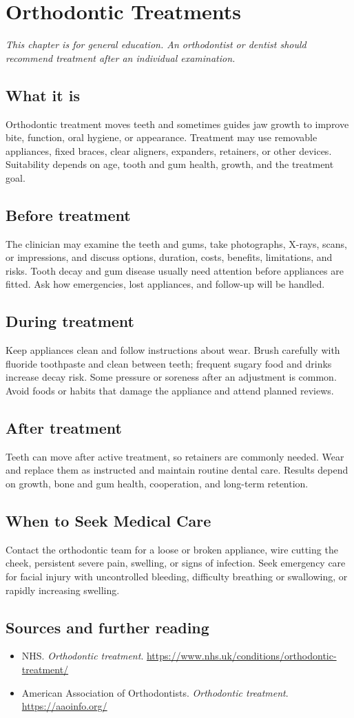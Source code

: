 \chapter{Orthodontic Treatments}

\medskip
\noindent\textit{This chapter is for general education. An orthodontist or dentist should recommend treatment after an individual examination.}

\section*{What it is}
Orthodontic treatment moves teeth and sometimes guides jaw growth to improve bite, function, oral hygiene, or appearance. Treatment may use removable appliances, fixed braces, clear aligners, expanders, retainers, or other devices. Suitability depends on age, tooth and gum health, growth, and the treatment goal.

\section*{Before treatment}
The clinician may examine the teeth and gums, take photographs, X-rays, scans, or impressions, and discuss options, duration, costs, benefits, limitations, and risks. Tooth decay and gum disease usually need attention before appliances are fitted. Ask how emergencies, lost appliances, and follow-up will be handled.

\section*{During treatment}
Keep appliances clean and follow instructions about wear. Brush carefully with fluoride toothpaste and clean between teeth; frequent sugary food and drinks increase decay risk. Some pressure or soreness after an adjustment is common. Avoid foods or habits that damage the appliance and attend planned reviews.

\section*{After treatment}
Teeth can move after active treatment, so retainers are commonly needed. Wear and replace them as instructed and maintain routine dental care. Results depend on growth, bone and gum health, cooperation, and long-term retention.

\section*{When to Seek Medical Care}
Contact the orthodontic team for a loose or broken appliance, wire cutting the cheek, persistent severe pain, swelling, or signs of infection. Seek emergency care for facial injury with uncontrolled bleeding, difficulty breathing or swallowing, or rapidly increasing swelling.

\section*{Sources and further reading}
\begin{itemize}
\item NHS. \textit{Orthodontic treatment}. \url{https://www.nhs.uk/conditions/orthodontic-treatment/}
\item American Association of Orthodontists. \textit{Orthodontic treatment}. \url{https://aaoinfo.org/}
\end{itemize}
